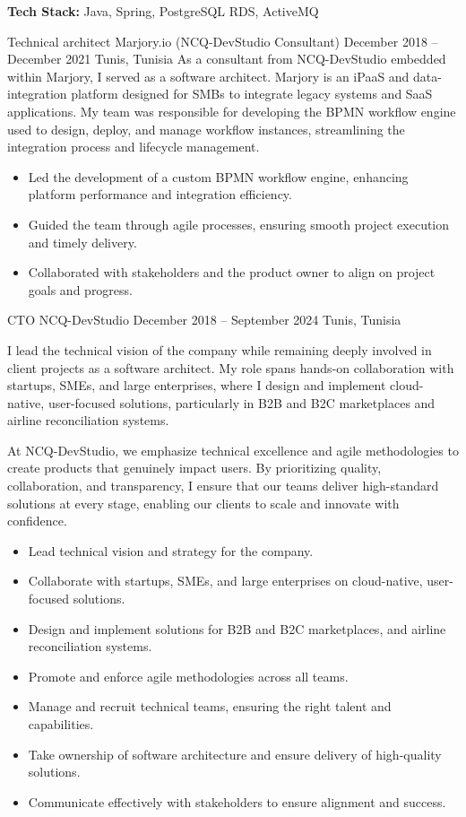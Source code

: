 \documentclass[10pt,a4paper]{resume-settings}
\begin{document}
    \textbf{Tech Stack:} Java, Spring, PostgreSQL RDS, ActiveMQ
\divider

\cvevent
    {Technical architect}
    {Marjory.io (NCQ-DevStudio Consultant)}
    {December 2018 -- December 2021}
    {Tunis, Tunisia}
    {As a consultant from NCQ-DevStudio embedded within Marjory, I served as a software architect. Marjory is an iPaaS and data-integration platform designed for SMBs to integrate legacy systems and SaaS applications. My team was responsible for developing the BPMN workflow engine used to design, deploy, and manage workflow instances, streamlining the integration process and lifecycle management.}

    \begin{itemize}
        \item Led the development of a custom BPMN workflow engine, enhancing platform performance and integration efficiency.
        \item Guided the team through agile processes, ensuring smooth project execution and timely delivery.
        \item Collaborated with stakeholders and the product owner to align on project goals and progress.
    \end{itemize}

\divider

\cvevent
    {CTO}
    {NCQ-DevStudio}
    {December 2018 -- September 2024}
    {Tunis, Tunisia}
    {I lead the technical vision of the company while remaining deeply involved in client projects as a software architect. My role spans hands-on collaboration with startups, SMEs, and large enterprises, where I design and implement cloud-native, user-focused solutions, particularly in B2B and B2C marketplaces and airline reconciliation systems.

    At NCQ-DevStudio, we emphasize technical excellence and agile methodologies to create products that genuinely impact users. By prioritizing quality, collaboration, and transparency, I ensure that our teams deliver high-standard solutions at every stage, enabling our clients to scale and innovate with confidence.}

    \begin{itemize}
        \item Lead technical vision and strategy for the company.
        \item Collaborate with startups, SMEs, and large enterprises on cloud-native, user-focused solutions.
        \item Design and implement solutions for B2B and B2C marketplaces, and airline reconciliation systems.
        \item Promote and enforce agile methodologies across all teams.
        \item Manage and recruit technical teams, ensuring the right talent and capabilities.
        \item Take ownership of software architecture and ensure delivery of high-quality solutions.
        \item Communicate effectively with stakeholders to ensure alignment and success.
    \end{itemize}
\end{document}
